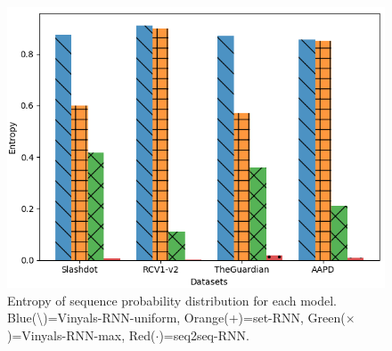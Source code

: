 \begin{figure}[t]
\includegraphics[width=1.00\columnwidth]{figs/entropy.png}

\caption{Entropy of sequence probability distribution for each model. Blue(\textbackslash)=Vinyals-RNN-uniform, Orange(+)=set-RNN, Green($\times$)=Vinyals-RNN-max, Red($\cdot$)=seq2seq-RNN.}
\label{fig:entropy}
\end{figure}






